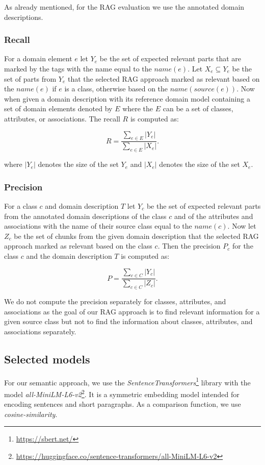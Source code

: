 As already mentioned, for the RAG evaluation we use the annotated domain descriptions.

\subsubsection{Recall}

For a domain element $e$ let $Y_e$ be the set of expected relevant parts that are marked by the tags with the name equal to the $name(e)$. Let $X_e \subseteq Y_e$ be the set of parts from $Y_e$ that the selected RAG approach marked as relevant based on the $name(e)$ if $e$ is a class, otherwise based on the $name(source(e))$. Now when given a domain description with its reference domain model containing a set of domain elements denoted by $E$ where the $E$ can be a set of classes, attributes, or associations. The recall $R$ is computed as:

\[ R = \dfrac{\sum_{e \in E}|Y_e|}{\sum_{e \in E}|X_e|}. \]

\noindent{}where $|Y_e|$ denotes the size of the set $Y_e$ and $|X_e|$ denotes the size of the set $X_e$.


\subsubsection{Precision}

For a class $c$ and domain description $T$ let $Y_{c}$ be the set of expected relevant parts from the annotated domain descriptions of the class $c$ and of the attributes and associations with the name of their source class equal to the $name(c)$. Now let $Z_{c}$ be the set of chunks from the given domain description that the selected RAG approach marked as relevant based on the class $c$. Then the precision $P_{c}$ for the class $c$ and the domain description $T$ is computed as:

\[ P = \dfrac{\sum_{c \in C}|Y_c|}{\sum_{c \in C}|Z_c|}. \]

We do not compute the precision separately for classes, attributes, and associations as the goal of our RAG approach is to find relevant information for a given source class but not to find the information about classes, attributes, and associations separately.


\subsection{Selected models}

For our semantic approach, we use the \textit{SentenceTransformers}\footnote{\url{https://sbert.net/}} library with the model \textit{all-MiniLM-L6-v2}\footnote{\url{https://huggingface.co/sentence-transformers/all-MiniLM-L6-v2}}. It is a symmetric embedding model intended for encoding sentences and short paragraphs. As a comparison function, we use \textit{cosine-similarity}.

